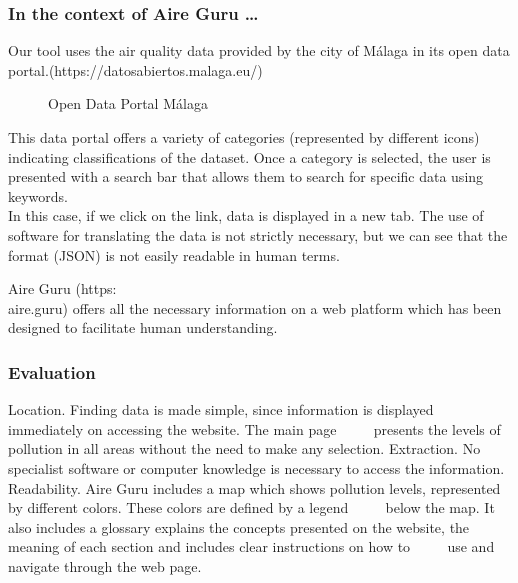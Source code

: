 \subsubsection*{In the context of Aire Guru \ldots} 

Our tool uses the air quality data provided by the city of Málaga in its open data portal.(https://datosabiertos.malaga.eu/)\\
\begin{figure}[ht]
    \centering
    \hfill
    \vfill
  \caption{Open Data Portal Málaga}
\end{figure}

    This data portal offers a variety of categories (represented by different icons) indicating classifications of the dataset.
    Once a category is selected, the user is presented with a search bar that allows them to search for specific data using keywords.\\
    
    In this case, if we click on the link, data is displayed in a new tab. The use of software
    for translating the data is not strictly necessary, but we can see that the format (JSON) is not easily readable in human terms.

Aire Guru (https:\\aire.guru) offers all the necessary information on a web platform which has been designed to facilitate human understanding.

\subsubsection*{Evaluation}  

\begin{itemize}
    \done Location. Finding data is made simple, since information is displayed immediately on accessing the website. The main page
         presents the levels of pollution in all areas without the need to make any selection.
    \done Extraction. No specialist software or computer knowledge is necessary to access the information.
    \done Readability. Aire Guru includes a map which shows pollution levels, represented by different colors. These colors are defined by a legend
         below the map. It also includes a glossary explains the concepts presented on the website, the meaning of each section and includes clear instructions on how to
         use and navigate through the web page.
\end{itemize}
